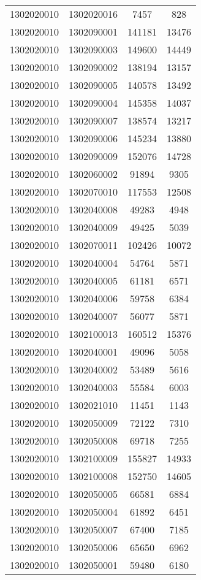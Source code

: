 \begin{longtable}{llcc}
1302020010 & 1302020016 & 7457 & 828\\
1302020010 & 1302090001 & 141181 & 13476\\
1302020010 & 1302090003 & 149600 & 14449\\
1302020010 & 1302090002 & 138194 & 13157\\
1302020010 & 1302090005 & 140578 & 13492\\
1302020010 & 1302090004 & 145358 & 14037\\
1302020010 & 1302090007 & 138574 & 13217\\
1302020010 & 1302090006 & 145234 & 13880\\
1302020010 & 1302090009 & 152076 & 14728\\
1302020010 & 1302060002 & 91894 & 9305\\
1302020010 & 1302070010 & 117553 & 12508\\
1302020010 & 1302040008 & 49283 & 4948\\
1302020010 & 1302040009 & 49425 & 5039\\
1302020010 & 1302070011 & 102426 & 10072\\
1302020010 & 1302040004 & 54764 & 5871\\
1302020010 & 1302040005 & 61181 & 6571\\
1302020010 & 1302040006 & 59758 & 6384\\
1302020010 & 1302040007 & 56077 & 5871\\
1302020010 & 1302100013 & 160512 & 15376\\
1302020010 & 1302040001 & 49096 & 5058\\
1302020010 & 1302040002 & 53489 & 5616\\
1302020010 & 1302040003 & 55584 & 6003\\
1302020010 & 1302021010 & 11451 & 1143\\
1302020010 & 1302050009 & 72122 & 7310\\
1302020010 & 1302050008 & 69718 & 7255\\
1302020010 & 1302100009 & 155827 & 14933\\
1302020010 & 1302100008 & 152750 & 14605\\
1302020010 & 1302050005 & 66581 & 6884\\
1302020010 & 1302050004 & 61892 & 6451\\
1302020010 & 1302050007 & 67400 & 7185\\
1302020010 & 1302050006 & 65650 & 6962\\
1302020010 & 1302050001 & 59480 & 6180\\

\end{longtable}
